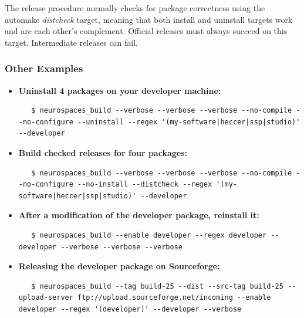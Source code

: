 \documentclass[12pt]{article}
\begin{document}
The release procedure normally checks for package correctness using the automake {\it distcheck} target, meaning that both install and uninstall targets work and are each other's complement. Official releases must always succeed on this target. Intermediate releases can fail.


\subsubsection*{Other Examples}

\begin{itemize}
\item {\bf Uninstall 4 packages on your developer machine:}
\begin{verbatim}
   $ neurospaces_build --verbose --verbose --verbose --no-compile --no-configure --uninstall --regex '(my-software|heccer|ssp|studio)' --developer
\end{verbatim}

\item {\bf Build checked releases for four packages:}
\begin{verbatim}
   $ neurospaces_build --verbose --verbose --verbose --no-compile --no-configure --no-install --distcheck --regex '(my-software|heccer|ssp|studio)' --developer
\end{verbatim}

\item {\bf After a modification of the developer package, reinstall it:}
\begin{verbatim}
   $ neurospaces_build --enable developer --regex developer --developer --verbose --verbose --verbose
\end{verbatim}

\item {\bf Releasing the developer package on Sourceforge:}
\begin{verbatim}
   $ neurospaces_build --tag build-25 --dist --src-tag build-25 --upload-server ftp://upload.sourceforge.net/incoming --enable developer --regex '(developer)' --developer --verbose
\end{verbatim}
\end{itemize}
\end{document}
